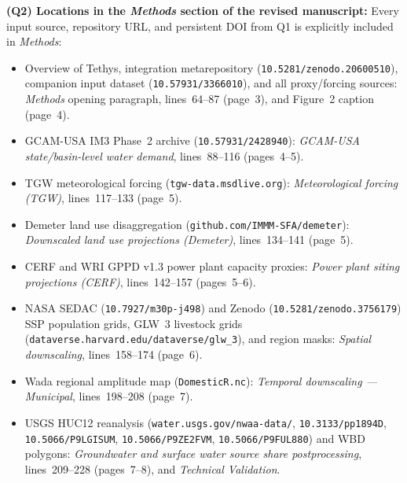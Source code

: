 \documentclass[11pt,letterpaper]{article}
\begin{document}
{\smallskip
\textbf{(Q2) Locations in the \textit{Methods} section of the revised manuscript:}
Every input source, repository URL, and persistent DOI from Q1 is explicitly included in \textit{Methods}:
\begin{itemize}[leftmargin=1.5em, topsep=2pt, itemsep=2pt]
  \item Overview of Tethys, integration metarepository (\texttt{10.5281/zenodo.20600510}), companion input dataset (\texttt{10.57931/3366010}), and all proxy/forcing sources: \textit{Methods} opening paragraph, lines~64--87 (page~3), and Figure~2 caption (page~4).
  \item GCAM-USA IM3 Phase~2 archive (\texttt{10.57931/2428940}): \textit{GCAM-USA state/basin-level water demand}, lines~88--116 (pages~4--5).
  \item TGW meteorological forcing (\texttt{tgw-data.msdlive.org}): \textit{Meteorological forcing (TGW)}, lines~117--133 (page~5).
  \item Demeter land use disaggregation (\texttt{github.com/IMMM-SFA/demeter}): \textit{Downscaled land use projections (Demeter)}, lines~134--141 (page~5).
  \item CERF and WRI GPPD v1.3 power plant capacity proxies: \textit{Power plant siting projections (CERF)}, lines~142--157 (pages~5--6).
  \item NASA SEDAC (\texttt{10.7927/m30p-j498}) and Zenodo (\texttt{10.5281/zenodo.3756179}) SSP population grids, GLW~3 livestock grids (\texttt{dataverse.harvard.edu/dataverse/glw\_3}), and region masks: \textit{Spatial downscaling}, lines~158--174 (page~6).
  \item Wada regional amplitude map (\texttt{DomesticR.nc}): \textit{Temporal downscaling --- Municipal}, lines~198--208 (page~7).
  \item USGS HUC12 reanalysis (\texttt{water.usgs.gov/\allowbreak nwaa-data/}, \texttt{10.3133/\allowbreak pp1894D}, \texttt{10.5066/\allowbreak P9LGISUM}, \texttt{10.5066/\allowbreak P9ZE2FVM}, \texttt{10.5066/\allowbreak P9FUL880}) and WBD polygons: \textit{Groundwater and surface water source share postprocessing}, lines~209--228 (pages~7--8), and \textit{Technical Validation}.
\end{itemize}

}
\end{document}
